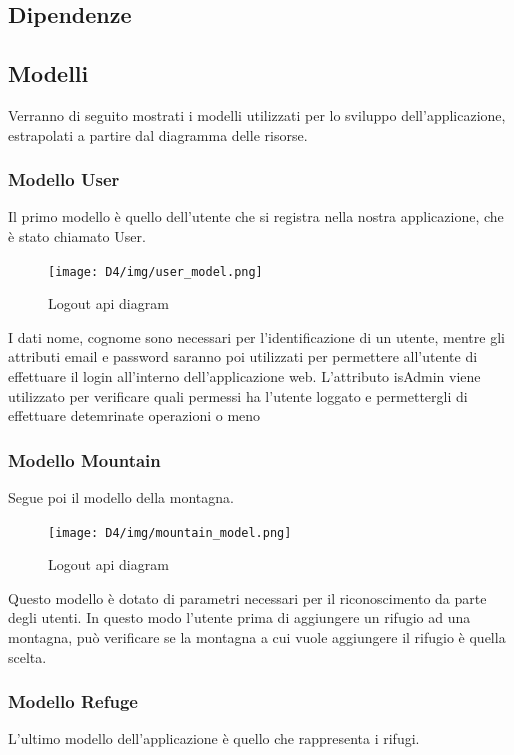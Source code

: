 \documentclass[a4paper,12pt]{article}
\begin{document}
\subsection{Dipendenze}

\newpage
\subsection{Modelli}
Verranno di seguito mostrati i modelli utilizzati per lo sviluppo dell'applicazione, estrapolati a partire dal diagramma delle risorse.

\subsubsection{Modello User}
Il primo modello è quello dell'utente che si registra nella nostra applicazione, che è stato chiamato User.

    \begin{figure}[H]
    \centering
    \texttt{[image: D4/img/user\_model.png]}
    \caption{Logout api diagram}
    \end{figure}

I dati nome, cognome sono necessari per l'identificazione di un utente, mentre gli attributi email e password saranno poi utilizzati per permettere all'utente di effettuare il login all'interno dell'applicazione web. \newline
L'attributo isAdmin viene utilizzato per verificare quali permessi ha l'utente loggato e permettergli di effettuare detemrinate operazioni o meno

\subsubsection{Modello Mountain}
Segue poi il modello della montagna.

    \begin{figure}[H]
    \centering
    \texttt{[image: D4/img/mountain\_model.png]}
    \caption{Logout api diagram}
    \end{figure}
Questo modello è dotato di parametri necessari per il riconoscimento da parte degli utenti. \newline
In questo modo l'utente prima di aggiungere un rifugio ad una montagna, può verificare se la montagna a cui vuole aggiungere il rifugio è quella scelta.

\subsubsection{Modello Refuge}
L'ultimo modello dell'applicazione è quello che rappresenta i rifugi.
\end{document}
